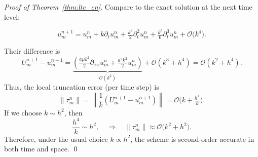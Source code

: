 \begin{proof}[Proof of Theorem~\ref{thm:lte_cn}]
  Compare to the exact solution at the next time level:

  \[
    u_m^{n+1}
    = u_m^n
    + k\partial_t u_m^n
    + \tfrac{k^2}{2}\partial_t^2 u_m^n
    + \tfrac{k^3}{6}\partial_t^3 u_m^n
    + \mathcal{O}\bigl(k^4\bigr).
  \]

  Their difference is
  \[
    U_m^{n+1} - u_m^{n+1} =
    \underbrace{\left(\tfrac{a\mu k^2}{2}\partial_{xx}u_m^n
      + \tfrac{a^2k^2}{2}u_m^n\right)}_{\mathcal{O}(k^2)}
    + \mathcal{O}\left(k^3 + h^4\right)
    = \mathcal{O}\left(k^2 + h^4\right).
  \]
  Thus, the local truncation error (per time step) is
  \[
    \lVert{\tau_m^n}\rVert
    = \left\lVert\dfrac{1}{k}\left(U_m^{n+1} - u_m^{n+1}\right) \right\rVert
    = \mathcal{O}\bigl(k + \tfrac{h^4}{k}\bigr).
  \]
  If we choose $k \sim h^2$, then
  \[
    \frac{h^4}{k} \sim h^2,
    \quad
    \Rightarrow
    \quad
    \lVert{\tau_m^n}\rVert \approx \mathcal{O}\bigl(k^2 + h^2\bigr).
  \]
  Therefore, under the usual choice $k \propto h^2$, the scheme is second-order accurate in both time and space. \qed
\end{proof}

